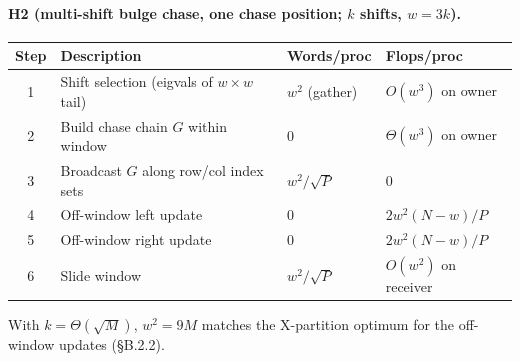 \documentclass[11pt]{article}
\begin{document}
\paragraph{H2 (multi-shift bulge chase, one chase position; $k$ shifts, $w = 3k$).}
\begin{center}\footnotesize
\setlength{\tabcolsep}{4pt}
\begin{tabular}{@{}clll@{}}
\toprule
Step & Description                                      & Words/proc                                       & Flops/proc \\
\midrule
1 & Shift selection (eigvals of $w{\times}w$ tail)     & $w^2$ (gather)                                  & $O(w^3)$ on owner \\
2 & Build chase chain $G$ within window                & $0$                                             & $\Theta(w^3)$ on owner \\
3 & Broadcast $G$ along row/col index sets             & $w^2 / \sqrt{P}$                                & $0$ \\
4 & Off-window left update                             & $0$                                             & $2 w^2 (N-w) / P$ \\
5 & Off-window right update                            & $0$                                             & $2 w^2 (N-w) / P$ \\
6 & Slide window                                       & $w^2 / \sqrt P$                                 & $O(w^2)$ on receiver \\
\bottomrule
\end{tabular}
\end{center}
With $k = \Theta(\sqrt{M})$, $w^2 = 9 M$ matches the X-partition optimum
for the off-window updates (\S B.2.2).
\end{document}
